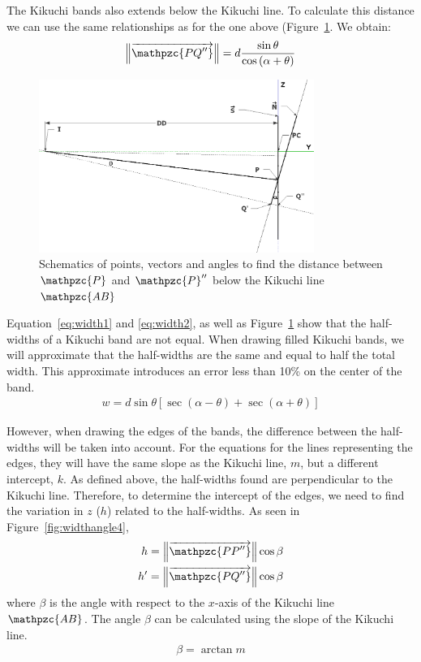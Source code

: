 \documentclass[letterpaper]{article}
\newcommand{\norm}[1]{\left\|#1\right\|}
\newcommand{\var}[1]{\mathpzc{#1}}
\begin{document}
	The Kikuchi bands also extends below the Kikuchi line. To calculate this distance we can use the same relationships as for the one above (Figure~\ref{fig:widthangle3}. 
	We obtain:
	\begin{eqnarray}
		\norm{\overrightarrow{\var{PQ^{\prime\prime}}}} = d \frac{\sin{\theta}}{\cos{\left(\alpha + \theta\right)}}
		\label{eq:width2}
	\end{eqnarray}
	
	\begin{figure}
		\centering
		\includegraphics[width=0.8\textwidth]{figures/widthangle3}
		\caption{Schematics of points, vectors and angles to find the distance between $\var{P}$ and $\var{P}^{\prime\prime}$ below the Kikuchi line $\var{AB}$}
		\label{fig:widthangle3}
	\end{figure}
	
	Equation~\ref{eq:width1} and \ref{eq:width2}, as well as Figure~\ref{fig:widthangle3} show that the half-widths of a Kikuchi band are not equal.
	When drawing filled Kikuchi bands, we will approximate that the half-widths are the same and equal to half the total width. 
	This approximate introduces an error less than 10\% on the center of the band.
	\begin{eqnarray}
		w = d \sin{\theta} \left[\sec{\left(\alpha - \theta\right)} + \sec{\left(\alpha + \theta\right)}\right]
		\label{eq:totalwidth}
	\end{eqnarray}
	
	However, when drawing the edges of the bands, the difference between the half-widths will be taken into account.
	For the equations for the lines representing the edges, they will have the same slope as the Kikuchi line, $m$, but a different intercept, $k$.
	As defined above, the half-widths found are perpendicular to the Kikuchi line. 
	Therefore, to determine the intercept of the edges, we need to find the variation in $z$ ($h$) related to the half-widths.
	As seen in Figure~\ref{fig:widthangle4}, 
	\begin{eqnarray}
		h = \norm{\overrightarrow{\var{PP^{\prime\prime}}}} \cos\beta\\
		h^\prime = \norm{\overrightarrow{\var{PQ^{\prime\prime}}}} \cos\beta
		\label{eq:height1}
	\end{eqnarray}
	where $\beta$ is the angle with respect to the $x$-axis of the Kikuchi line $\var{AB}$.
	The angle $\beta$ can be calculated using the slope of the Kikuchi line.
	\begin{eqnarray}
		\beta = \arctan{m}
		\label{eq:beta}
	\end{eqnarray}
	
\end{document}
